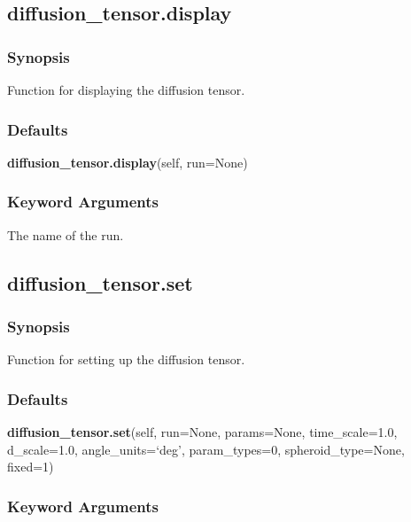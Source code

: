 \subsection{diffusion\_tensor.display}


\subsubsection{Synopsis}

Function for displaying the diffusion tensor.



\subsubsection{Defaults}

\textsf{\textbf{diffusion\_tensor.display}(self, run=None)}


\subsubsection{Keyword Arguments}

  The name of the run. 





\newpage

\subsection{diffusion\_tensor.set}


\subsubsection{Synopsis}

Function for setting up the diffusion tensor.



\subsubsection{Defaults}

\textsf{\textbf{diffusion\_tensor.set}(self, run=None, params=None, time\_scale=1.0, d\_scale=1.0, angle\_units=`deg', param\_types=0, spheroid\_type=None, fixed=1)}


\subsubsection{Keyword Arguments}

